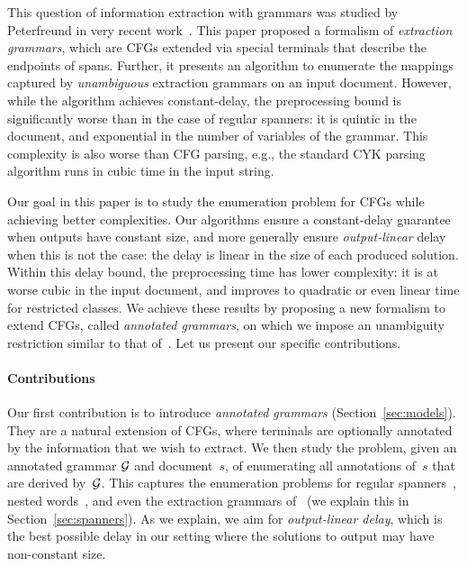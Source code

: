 %
%

This question of information extraction with grammars was studied by Peterfreund in very recent work~\cite{Peterfreund21}. This paper proposed a formalism of \emph{extraction grammars}, which are CFGs extended via special terminals that describe the endpoints of spans.
Further, it presents an algorithm to enumerate the mappings captured by
\emph{unambiguous} extraction grammars on an input document.
However, while the algorithm achieves constant-delay, the preprocessing bound is significantly worse than in the case of regular spanners: it is quintic in the document, and exponential in the number of variables of the grammar. This complexity is also worse than CFG parsing, e.g., the standard CYK parsing algorithm runs in cubic time in the input string.

%
%
%

Our goal in this paper is to study the enumeration problem for CFGs while
achieving better complexities. Our algorithms ensure a constant-delay
guarantee when outputs have constant size, and more generally ensure
\emph{output-linear} delay when this is not the case: the delay is linear in the
size of each produced solution. Within this delay bound, the preprocessing
time has lower complexity: it is at worse cubic in the
input document, and improves to quadratic or even linear time for restricted
classes. We achieve these results by proposing a new formalism to extend CFGs, called
\emph{annotated grammars}, on which we impose an unambiguity restriction similar
to that of~\cite{Peterfreund21}. Let us present our specific contributions.

    \paragraph{Contributions}
    Our first contribution is to introduce \emph{annotated grammars} (Section~\ref{sec:models}).
    They are a natural extension of CFGs, where terminals are optionally annotated by the information that we wish to extract.
    We then study the problem, given an annotated grammar $\mathcal{G}$ and document~$s$, of
    enumerating all annotations of~$s$ that are derived by~$\mathcal{G}$.
This captures the enumeration problems for regular spanners~\cite{FlorenzanoRUVV18,amarilli2020constant}, nested words~\cite{icdt2020nested}, and
    even the extraction grammars of~\cite{Peterfreund21} (we explain this in Section~\ref{sec:spanners}). 
    As we explain, we aim for \emph{output-linear delay}, which is the best
    possible delay in our setting where the solutions to output may have
    non-constant size. 

